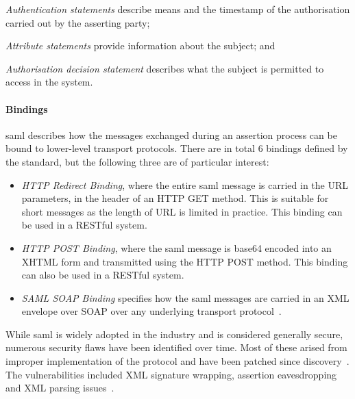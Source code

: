 \begin{enumerate*}[label=(\roman*)]
    \item \textit{Authentication statements} describe means and the timestamp of the authorisation carried out by the asserting party;
    \item \textit{Attribute statements} provide information about the subject; and
    \item \textit{Authorisation decision statement} describes what the subject is permitted to access in the system.
\end{enumerate*}


\paragraph{Bindings}
\acrshort{saml} describes how the messages exchanged during an assertion process can be bound to lower-level transport protocols. There are in total 6 bindings defined by the standard, but the following three are of particular interest:

\begin{itemize}[noitemsep]
    \item \textit{HTTP Redirect Binding}, where the entire \acrshort{saml} message is carried in the URL parameters, in the header of an HTTP GET method. This is suitable for short messages as the length of URL is limited in practice. This binding can be used in a RESTful system.
    \item \textit{HTTP POST Binding}, where the \acrshort{saml} message is base64 encoded into an XHTML form and transmitted using the HTTP POST method. This binding can also be used in a RESTful system.
    \item \textit{SAML SOAP Binding} specifies how the \acrshort{saml} messages are carried in an XML envelope over SOAP over any underlying transport protocol~\cite{Cantor2005BindingsV2.0}.
\end{itemize}


While \acrshort{saml} is widely adopted in the industry and is considered generally secure, numerous security flaws have been identified over time. Most of these arised from improper implementation of the protocol and have been patched since discovery~\cite{Krawczyk2014SecureAttacks}. The vulnerabilities included XML signature wrapping, assertion eavesdropping~\cite{Chen2014Environment-BoundAssertions} and XML parsing issues~\cite{Degges2018AVulnerability}.